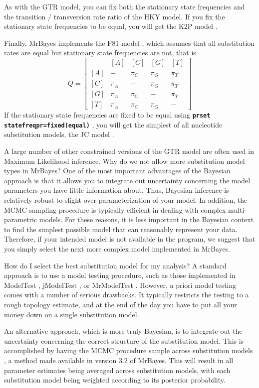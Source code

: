 \documentclass[12pt]{book}
\newcommand{\tb}[1]{\texttt{\textbf{#1}} }
\begin{document}
As with the GTR model, you can fix both the stationary state frequencies and the
transition / transversion rate ratio of the HKY model. If you fix the stationary state
frequencies to be equal, you will get the K2P model \citep{kimura80}.

Finally, MrBayes implements the F81 model \citep{felsenstein81}, which assumes that all
substitution rates are equal but stationary state frequencies are not, that is
\[
Q=\begin{bmatrix}
    & [A] & [C] & [G] & [T] \\ 
 [A]& - & \pi_C & \pi_G & \pi_T\\ 
 [C]& \pi_A & - & \pi_G &\pi_T \\ 
 [G]& \pi_A & \pi_C& - & \pi_T\\ 
 [T]& \pi_A & \pi_C&\pi_G  & -
\end{bmatrix}
\]
If the stationary state frequencies are fixed to be equal using \tb{prset
statefreqpr=fixed(equal)}, you will get the simplest of all nucleotide
substitution models, the JC model \citep{jukes69}.

A large number of other constrained versions of the GTR model are often used in Maximum
Likelihood inference. Why do we not allow more substitution model types in MrBayes?
One of the most important advantages of the Bayesian approach is that it allows you to
integrate out uncertainty concerning the model parameters you have little information
about. Thus, Bayesian inference is relatively robust to slight over-parameterization of
your model. In addition, the MCMC sampling procedure is typically efficient in dealing
with complex multi-parametric models. For these reasons, it is less important in the
Bayesian context to find the simplest possible model that can reasonably represent your
data. Therefore, if your intended model is not available in the program, we suggest that
you simply select the next more complex model implemented in MrBayes.

How do I select the best substitution model for my analysis? A standard approach is to use
a model testing procedure, such as those implemented in ModelTest \citep{posada98},
jModelTest \citep{posada08}, or MrModelTest \citep{}. However, a priori model testing comes
with a number of serious drawbacks. It typically restricts the testing to a rough topology estimate,
and at the end of the day you have to put all your money down on a single substitution model.

An alternative approach, which is more truly Bayesian, is to integrate out the uncertainty
concerning the correct structure of the substitution model. This is accomplished
by having the MCMC procedure sample across substitution models \citep{huelsenbeck04d},
a method made available in version 3.2 of MrBayes. This will result in
all parameter estimates being averaged across substitution models, with each substitution
model being weighted according to its posterior probability.
\end{document}
